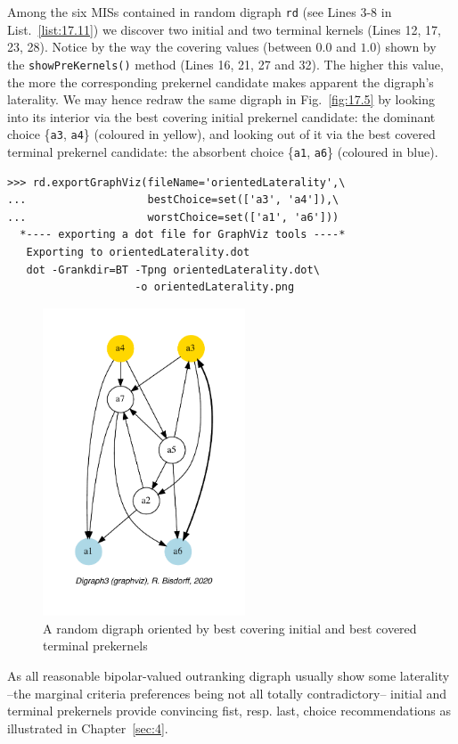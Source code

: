 Among the six MISs contained in random digraph \texttt{rd} (see Lines 3-8 in List.~\vref{list:17.11}) we discover two initial and two terminal kernels (Lines 12, 17, 23, 28). Notice by the way the covering values (between $0.0$ and $1.0$) shown by the \texttt{showPreKernels()} method (Lines 16, 21, 27 and 32). The higher this value, the more the corresponding prekernel candidate makes apparent the digraph's laterality. We may hence redraw the same digraph in Fig.~\vref{fig:17.5} by looking into its interior via the best covering initial prekernel candidate: the dominant choice \{\texttt{a3}, \texttt{a4}\} (coloured in yellow), and looking out of it via the best covered terminal prekernel candidate: the absorbent choice \{\texttt{a1}, \texttt{a6}\} (coloured in blue).
\begin{lstlisting}
>>> rd.exportGraphViz(fileName='orientedLaterality',\
...                   bestChoice=set(['a3', 'a4']),\
...                   worstChoice=set(['a1', 'a6']))
  *---- exporting a dot file for GraphViz tools ----*
   Exporting to orientedLaterality.dot
   dot -Grankdir=BT -Tpng orientedLaterality.dot\
                    -o orientedLaterality.png
\end{lstlisting}
\begin{figure}[h]
\sidecaption[t]
\includegraphics[width=6cm]{Figures/17-5-orientedLaterality.pdf}
\caption{A random digraph oriented by best covering initial and
   best covered terminal prekernels}
\label{fig:17.5}       %
\end{figure}

As all reasonable bipolar-valued outranking digraph usually show some laterality --the marginal criteria preferences being not all totally contradictory-- initial and terminal prekernels provide convincing fist, resp. last, choice recommendations as illustrated in Chapter~\vref{sec:4}.

